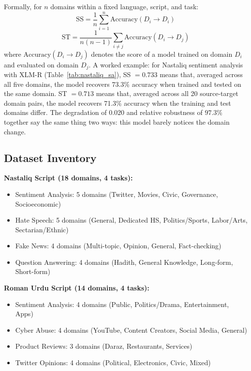\documentclass[10pt,twocolumn,journal]{IEEEtran}
\begin{document}
Formally, for $n$ domains within a fixed language, script, and task:
\begin{equation}
\text{SS} = \frac{1}{n} \sum_{i=1}^{n} \text{Accuracy}(D_i \to D_i)
\label{eq:ss}
\end{equation}
\begin{equation}
\text{ST} = \frac{1}{n(n-1)} \sum_{i \neq j} \text{Accuracy}(D_i \to D_j)
\label{eq:st}
\end{equation}
where $\text{Accuracy}(D_i \to D_j)$ denotes the score of a model trained on domain $D_i$ and evaluated on domain $D_j$. A worked example: for Nastaliq sentiment analysis with XLM-R (Table~\ref{tab:nastaliq_sa}), SS $= 0.733$ means that, averaged across all five domains, the model recovers 73.3\% accuracy when trained and tested on the same domain. ST $=0.713$ means that, averaged across all 20 source-target domain pairs, the model recovers 71.3\% accuracy when the training and test domains differ. The degradation of $0.020$ and relative robustness of $97.3\%$ together say the same thing two ways: this model barely notices the domain change.

\subsection{Dataset Inventory}

\textbf{Nastaliq Script (18 domains, 4 tasks):}
\begin{itemize}[leftmargin=*]
\item Sentiment Analysis: 5 domains (Twitter, Movies, Civic, Governance, Socioeconomic)
\item Hate Speech: 5 domains (General, Dedicated HS, Politics/Sports, Labor/Arts, Sectarian/Ethnic)
\item Fake News: 4 domains (Multi-topic, Opinion, General, Fact-checking)
\item Question Answering: 4 domains (Hadith, General Knowledge, Long-form, Short-form)
\end{itemize}

\textbf{Roman Urdu Script (14 domains, 4 tasks):}
\begin{itemize}[leftmargin=*]
\item Sentiment Analysis: 4 domains (Public, Politics/Drama, Entertainment, Apps)
\item Cyber Abuse: 4 domains (YouTube, Content Creators, Social Media, General)
\item Product Reviews: 3 domains (Daraz, Restaurants, Services)
\item Twitter Opinions: 4 domains (Political, Electronics, Civic, Mixed)
\end{itemize}
\end{document}

